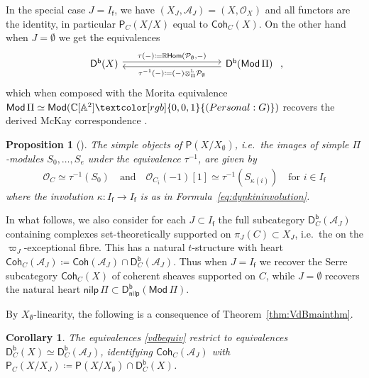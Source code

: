 \documentclass[reqno,a4paper]{amsart}
\newcommand{\personal}[1]{\textcolor[rgb]{0,0,1}{(Personal: #1)}}
\newcommand{\parth}[1]{\textcolor[rgb]{0,1,0}{(Parth: #1)}}
\newcommand{\todo}[1]{\textcolor{red}{(Todo: #1)}}
\newcommand\ast{\personal}[1]{\ignorespaces}
\newcommand\ast{\parth}[1]{\ignorespaces}
\newcommand\ast{\todo}[1]{\ignorespaces}
\newcommand{\calA}{\mathcal{A}}
\newcommand{\calP}{\mathcal{P}}
\newcommand{\A}{\mathbb{A}}
\newcommand{\C}{\mathbb{C}}
\newcommand{\LL}{\mathbb{L}}
\newcommand{\R}{\mathbb{R}}
\newcommand{\scrO}{\mathscr{O}}
\newcommand{\sff}{\mathsf{f}}
\newcommand{\catMod}{\mathsf{Mod}}
\newcommand{\catP}{\mathsf{P}}
\newcommand{\catPC}{\mathsf{P}_{C}}
\newcommand{\ModPi}{\catMod\, \Pi}
\newcommand{\nilpPi}{\mathsf{nilp}\, \Pi}
\newcommand{\catCoh}{\mathsf{Coh}}
\newcommand{\catCohC}{\mathsf{Coh}_C}
\newcommand{\catDb}{\mathsf{D}^\mathsf{b}}
\newcommand{\catDbC}{\mathsf{D}^\mathsf{b}_C}
\newcommand{\rsv}{X}
\newcommand{\ssv}{X_\emptyset}
\newcommand{\psv}{X_J}
\newcommand{\Hom}{\mathsf{Hom}}
\theoremstyle{basic-theorem}
\newtheorem{corollary}[theorem]{Corollary}
\newtheorem{proposition}[theorem]{Proposition}
\numberwithin{equation}{section}
\begin{document}
In the special case $J=I_\sff$, we have $(\psv,\calA_J)=(\rsv,\scrO_\rsv)$ and all functors are the identity, in particular $\catPC(\rsv/\rsv)$ equal to $\catCohC(\rsv)$. On the other hand when $J=\emptyset$ we get the equivalences
\begin{align}\label{eq:tau}
   \begin{tikzcd}[ampersand replacement=\&, column sep=10em]
       \catDb(\rsv)
       \arrow[r, "{\tau(-)\coloneqq\R\Hom(\calP_\emptyset,-)}", shift left=1]
       \& \catDb(\ModPi)
       \arrow[l, "{\tau^{-1}(-)\coloneqq(-) \otimes^{\LL}_{\Pi}\calP_\emptyset}", shift left=1]
   \end{tikzcd}\ ,
\end{align}
which when composed with the Morita equivalence $\ModPi\simeq \catMod(\C[\A^2]\ast G)$ recovers the derived McKay correspondence \cite{Kleinian_derived}.

\begin{proposition}[{\cite[Proposition~3.5.7]{VdB_Flops}}]\label{rem:simple}
    The simple objects of $\catP(\rsv/\ssv)$, i.e.\ the images of simple $\Pi$-modules $S_0,\ldots,S_e$ under the equivalence $\tau^{-1}$, are given by
	\begin{align}\label{eq:sphericalobj}
        \scrO_{C}\simeq\tau^{-1}(S_0)\quad \text{and} \quad
        \scrO_{C_i}(-1)[1]\simeq \tau^{-1}(S_{\kappa(i)})
        \quad\text{for } i\in I_\sff
	\end{align}
    where the involution $\kappa\colon I_\sff\to I_\sff$ is as in Formula~\eqref{eq:dynkininvolution}.
\end{proposition}

In what follows, we also consider for each $J\subset I_\sff$ the full subcategory $\catDbC(\calA_J)$ containing complexes set-theoretically supported on $\pi_J(C)\subset \psv$, i.e.\ the on the $\varpi_J$-exceptional fibre. This has a natural $t$-structure with heart $\catCohC(\calA_J)\coloneqq\catCoh(\calA_J)\cap \catDbC(\calA_J)$. Thus when $J=I_\sff$ we recover the Serre subcategory $\catCohC(\rsv)$ of coherent sheaves supported on $C$, while $J=\emptyset$ recovers the natural heart $\nilpPi\subset \catDb_\mathsf{nilp}(\ModPi)$.

By $\ssv$-linearity, the following is a consequence of Theorem~\ref{thm:VdBmainthm}.
\begin{corollary}
	The equivalences \eqref{vdbequiv} restrict to equivalences $\catDbC(\rsv)\simeq\catDbC(\calA_J)$, identifying $\catCohC(\calA_J)$ with $\catPC(\rsv/\psv)\coloneqq\catP(\rsv/\ssv)\cap \catDbC(\rsv)$.
\end{corollary}
\end{document}
